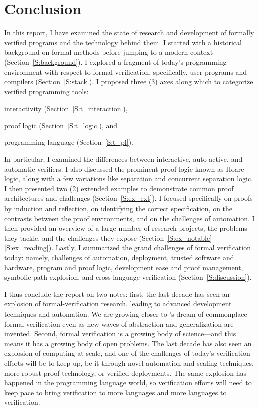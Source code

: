 \section{Conclusion}\label{S:conclusion}

In this report, I have examined the state of research and development of
formally verified programs and the technology behind them. I started with a
historical background on formal methods before jumping to a modern context
(Section~\ref{S:background}). I explored a fragment of today's programming
environment with respect to formal verification, specifically, user programs and
compilers (Section~\ref{S:stack}). I proposed three (3) axes along which to
categorize verified programming tools:
\begin{inlist}
\item interactivity (Section~\ref{S:t_interaction}),
\item proof logic (Section~\ref{S:t_logic}), and
\item programming language (Section~\ref{S:t_pl}).
\end{inlist}
In particular, I examined the differences between interactive, auto-active, and
automatic verifiers. I also discussed the prominent proof logic known as Hoare
logic, along with a few variations like separation and concurrent separation
logic. I then presented two (2) extended examples to demonstrate common proof
architectures and challenges (Section~\ref{S:ex_ext}). I focused specifically on
proofs by induction and reflection, on identifying the correct specification, on
the contrasts between the proof environments, and on the challenges of
automation. I then provided an overview of a large number of research projects,
the problems they tackle, and the challenges they expose
(Section~\ref{S:ex_notable}--\ref{S:ex_reading}). Lastly, I summarized the grand
challenges of formal verification today: namely, challenges of automation,
deployment, trusted software and hardware, program and proof logic, development
ease and proof management, symbolic path explosion, and cross-language
verification (Section~\ref{S:discussion}).

I thus conclude the report on two notes: first, the last decade has seen an
explosion of formal-verification research, leading to advanced development
techniques and automation. We are growing closer to \citeauthor{EWD:EWD1036}'s
dream of commonplace formal verification even as new waves of abstraction and
generalization are invented. Second, formal verification is a growing body of
science---and this means it has a growing body of open problems. The last decade
has also seen an explosion of computing at scale, and one of the challenges of
today's verification efforts will be to keep up, be it through novel automation
and scaling techniques, more robust proof technology, or verified deployments.
The same explosion has happened in the programming language world, so
verification efforts will need to keep pace to bring verification to more
languages and more languages to verification.

